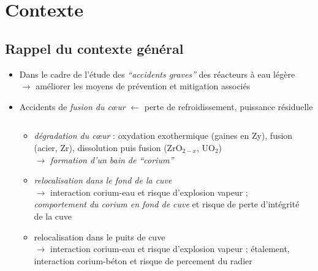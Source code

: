 
\section{Contexte}
\subsection{Rappel du contexte général}
\begin{frame}[fragile]
\begin{itemize}
  \item Dans le cadre de l'étude des \emph{``accidents graves''} des réacteurs à eau légère \\ $\rightarrow$ améliorer les moyens de prévention et mitigation associés
  \item Accidents de \emph{fusion du c\oe ur} $\leftarrow$ perte de refroidissement, puissance résiduelle
  \begin{columns}[T]
  \begin{column}{0.7\textwidth}
    \begin{itemize}
      \item \emph{dégradation du c\oe ur} : oxydation exothermique (gaines en Zy), fusion (acier, Zr), dissolution puis fusion (ZrO$_{2-x}$, UO$_2$) \\ $\rightarrow$ \emph{formation d'un bain de ``corium''}
      \item \emph{relocalisation dans le fond de la cuve} \\ $\rightarrow$ interaction corium-eau et risque d'explosion vapeur ; \emph{comportement du corium en fond de cuve}  et risque de perte d'intégrité de la cuve
      \item relocalisation dans le puits de cuve \\ $\rightarrow$ interaction corium-eau  et risque d'explosion vapeur ; étalement, interaction corium-béton et risque de percement du radier
    \end{itemize}
  \end{column}
  \begin{column}{0.25\textwidth}

\end{column}
\end{columns}
\end{itemize}
\end{frame}
